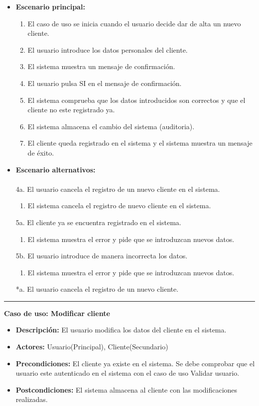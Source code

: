 \begin{itemize}\renewcommand{\labelitemi}{$\circ$}
 \item \textbf{Escenario principal:}
         \begin{enumerate}
          \item El caso de uso se inicia cuando el usuario decide dar de alta un nuevo cliente.
          \item El usuario introduce los datos personales del cliente.
          \item El sistema muestra un mensaje de confirmación.
          \item El usuario pulsa SI en el mensaje de confirmación.
          \item El sistema comprueba que los datos introducidos son correctos y que el cliente no este registrado ya.
	  \item El sistema almacena el cambio del sistema (auditoria).
          \item El cliente queda registrado en el sistema y el sistema muestra un mensaje de éxito.
         \end{enumerate}
  \item \textbf{Escenario alternativos:}\\\\
         4a. El usuario cancela el registro de un nuevo cliente en el sistema.
	      \begin{enumerate}
	       \item El sistema cancela el registro de nuevo cliente en el sistema.
	      \end{enumerate}
	5a. El cliente ya se encuentra registrado en el sistema.
	      \begin{enumerate}
	       \item El sistema muestra el error y pide que se introduzcan nuevos datos.
	      \end{enumerate}
           5b. El usuario introduce de manera incorrecta los datos.
		\begin{enumerate}
		 \item El sistema muestra el error y pide que se introduzcan nuevos datos.
		\end{enumerate}
          *a. El usuario cancela el registro de un nuevo cliente.
\end{itemize}
\smallskip
\hrule height 1pt
\smallskip
\textbf{Caso de uso: Modificar cliente}
\begin{itemize}\renewcommand{\labelitemi}{$\cdot$}
 \item \textbf{Descripción:} El usuario modifica los datos del cliente en el sistema.
  \item \textbf{Actores:} Usuario(Principal), Cliente(Secundario)
  \item \textbf{Precondiciones:} El cliente ya existe en el sistema. Se debe comprobar que el usuario este autenticado en el sistema con el caso de uso Validar usuario.
  \item \textbf{Postcondiciones:} El sistema almacena al cliente con las modificaciones realizadas.
\end{itemize}
